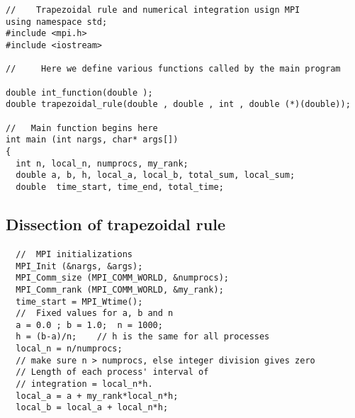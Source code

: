 \begin{verbatim}
//    Trapezoidal rule and numerical integration usign MPI
using namespace std;
#include <mpi.h>
#include <iostream>

//     Here we define various functions called by the main program

double int_function(double );
double trapezoidal_rule(double , double , int , double (*)(double));

//   Main function begins here
int main (int nargs, char* args[])
{
  int n, local_n, numprocs, my_rank; 
  double a, b, h, local_a, local_b, total_sum, local_sum;   
  double  time_start, time_end, total_time;

\end{verbatim}



\subsection*{Dissection of trapezoidal rule}

\paragraph{}
















\begin{verbatim}
  //  MPI initializations
  MPI_Init (&nargs, &args);
  MPI_Comm_size (MPI_COMM_WORLD, &numprocs);
  MPI_Comm_rank (MPI_COMM_WORLD, &my_rank);
  time_start = MPI_Wtime();
  //  Fixed values for a, b and n 
  a = 0.0 ; b = 1.0;  n = 1000;
  h = (b-a)/n;    // h is the same for all processes 
  local_n = n/numprocs;  
  // make sure n > numprocs, else integer division gives zero
  // Length of each process' interval of
  // integration = local_n*h.  
  local_a = a + my_rank*local_n*h;
  local_b = local_a + local_n*h;

\end{verbatim}



